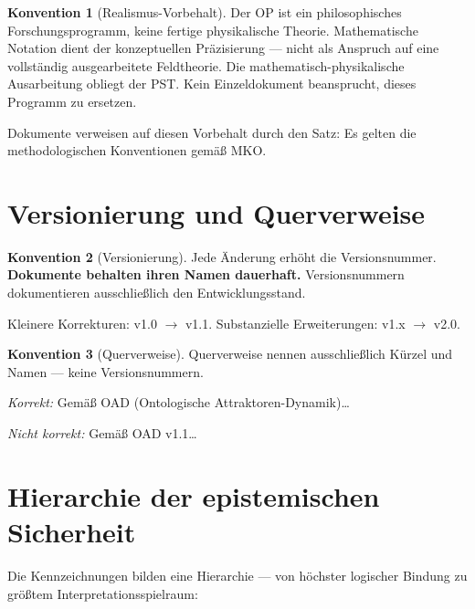 \documentclass[11pt,a4paper]{article}
\theoremstyle{plain}
\theoremstyle{definition}
\newtheorem{konvention}{Konvention}[section]
\begin{document}
\begin{konvention}[Realismus-Vorbehalt]
Der OP ist ein philosophisches Forschungsprogramm, keine fertige physikalische
Theorie. Mathematische Notation dient der konzeptuellen Pr\"{a}zisierung ---
nicht als Anspruch auf eine vollst\"{a}ndig ausgearbeitete Feldtheorie.
Die mathematisch-physikalische Ausarbeitung obliegt der PST. Kein Einzeldokument
beansprucht, dieses Programm zu ersetzen.

Dokumente verweisen auf diesen Vorbehalt durch den Satz: \glqq{}Es gelten
die methodologischen Konventionen gem\"{a}\ss{} MKO.\grqq{}
\end{konvention}

\section{Versionierung und Querverweise}

\begin{konvention}[Versionierung]
Jede \"{A}nderung erh\"{o}ht die Versionsnummer. \textbf{Dokumente behalten
ihren Namen dauerhaft.} Versionsnummern dokumentieren ausschlie\ss{}lich
den Entwicklungsstand.

Kleinere Korrekturen: v1.0 $\rightarrow$ v1.1.
Substanzielle Erweiterungen: v1.x $\rightarrow$ v2.0.
\end{konvention}

\begin{konvention}[Querverweise]
Querverweise nennen ausschlie\ss{}lich K\"{u}rzel und Namen --- keine
Versionsnummern.

\textit{Korrekt:} \glqq{}Gem\"{a}\ss{} OAD (Ontologische
Attraktoren-Dynamik)\ldots\grqq{}

\textit{Nicht korrekt:} \glqq{}Gem\"{a}\ss{} OAD v1.1\ldots\grqq{}
\end{konvention}

\section{Hierarchie der epistemischen Sicherheit}

Die Kennzeichnungen bilden eine Hierarchie --- von h\"{o}chster logischer
Bindung zu gr\"{o}\ss{}tem Interpretationsspielraum:
\end{document}
